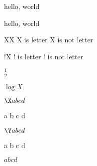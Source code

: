 \documentclass{amsart}
\makeatletter
\def\testcat#1{%
    \expandafter\ifcat \@car #1\@nil X%
        #1 is letter
    \else
        #1 is not letter
    \fi
}
\makeatother
\begin{document}
\lowercase{HELLO, WORLD}

hello, world

\testcat{X}

\testcat{!}

$\frac 1 2$

$\log X$

$\X a b c d$

\X a b c d

$\Y a b c d$

\Y a b c d

$\!a b\! c d$
\end{document}
